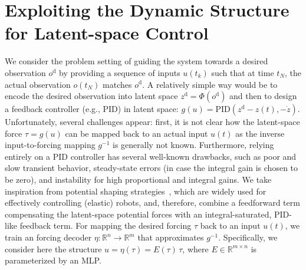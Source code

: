 \section{Exploiting the Dynamic Structure for Latent-space Control}\label{sec:con:latent_space_control}

We consider the problem setting of guiding the system towards a desired observation $o^\mathrm{d}$ by providing a sequence of inputs $u(t_k)$ such that at time $t_N$, the actual observation $o(t_N)$ matches $o^\mathrm{d}$.
A relatively simple way would be to encode the desired observation into latent space $z^\mathrm{d} = \Phi(o^\mathrm{d})$ and then to design a feedback controller (e.g., PID) in latent space: $g(u) = \mathrm{PID}(z^\mathrm{d}-z(t), -\dot{z})$.
Unfortunately, several challenges appear: first, it is not clear how the latent-space force $\tau = g(u)$ can be mapped back to an actual input $u(t)$ as the inverse input-to-forcing mapping $g^{-1}$ is generally not known.
Furthermore, relying entirely on a PID controller has several well-known drawbacks, such as poor and slow transient behavior, steady-state errors (in case the integral gain is chosen to be zero), and instability for high proportional and integral gains.
We take inspiration from potential shaping strategies~\cite{bloch2001controlled, ortega2021pid}, which are widely used for effectively controlling (elastic) robots, and, therefore, combine a feedforward term compensating the latent-space potential forces with an integral-saturated, PID-like feedback term. For mapping the desired forcing $\tau$ back to an input $u(t)$, we train an forcing decoder $\eta: \mathbb{R}^{n} \to \mathbb{R}^{m}$ that approximates $g^{-1}$. Specifically, we consider here the structure $u = \eta(\tau) = E(\tau) \, \tau$, where $E \in \mathbb{R}^{m \times n}$ is parameterized by an \gls{MLP}.

